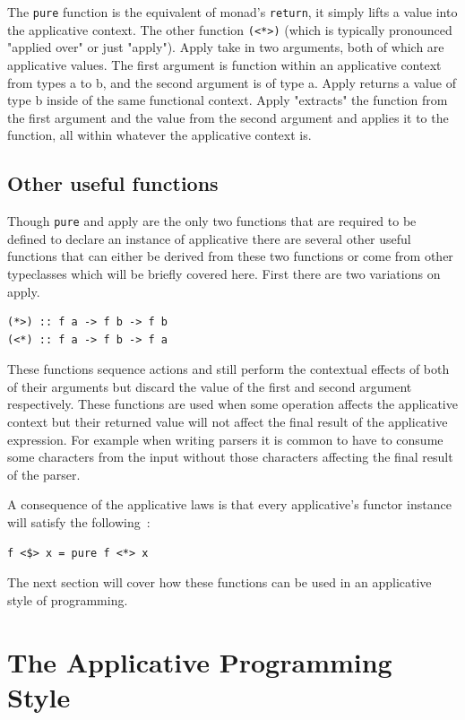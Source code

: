 The \texttt{pure} function is the equivalent of monad's \texttt{return}, it simply lifts a value into the applicative context. The other function \texttt{(<*>)} (which is typically pronounced "applied over" or just "apply"). Apply take in two arguments, both of which are applicative values. The first argument is function within an applicative context from types a to b, and the second argument is of type a. Apply returns a value of type b inside of the same functional context. Apply "extracts" the function from the first argument and the value from the second argument and applies it to the function, all within whatever the applicative context is.

\subsection{Other useful functions}

Though \texttt{pure} and apply are the only two functions that are required to be defined to declare an instance of applicative there are several other useful functions that can either be derived from these two functions or come from other typeclasses which will be briefly covered here. First there are two variations on apply.

\begin{lstlisting}[frame=tblr]
(*>) :: f a -> f b -> f b
(<*) :: f a -> f b -> f a
\end{lstlisting}

These functions sequence actions and still perform the contextual effects of both of their arguments but discard the value of the first and second argument respectively. These functions are used when some operation affects the applicative context but their returned value will not affect the final result of the applicative expression. For example when writing parsers it is common to have to consume some characters from the input without those characters affecting the final result of the parser.

A consequence of the applicative laws is that every applicative's functor instance will satisfy the following~\citep{control.applicative}: 

\begin{lstlisting}[frame=tblr]
f <$> x = pure f <*> x
\end{lstlisting}

The next section will cover how these functions can be used in an applicative style of programming. 

\section{The Applicative Programming Style}
\label{sec:appProgStyle}

